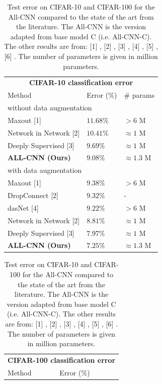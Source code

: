 \documentclass{article} %
\begin{document}
\begin{table}[h]
\caption{Test error on CIFAR-10 and CIFAR-100 for the All-CNN compared to the
  state of the art from the literature. The All-CNN is the version
  adapted from base model C (i.e. All-CNN-C). The other results are from: [1]
  \citep{Goodfellow2013}, [2] \citep{Lin_2014}, [3] \citep{Lee_2014},
  [4] \citep{Stollenga_2014}, [5] \citep{Nitish2013}, [6] \citep{Graham2015}. The number of
  parameters is given in million parameters.}
\label{results-cifar10}
\begin{minipage}{0.49\linewidth}
\centering
\begin{tabular}{lll}
\multicolumn{3}{c}{\bf CIFAR-10 classification error} \\
\multicolumn{1}{l}{Method} & \multicolumn{1}{l}{Error ($\%$)} & \multicolumn{1}{l}{\# params} \\
\hline
\multicolumn{3}{l}{without data augmentation} \\
\hline
Maxout [1]          &  $11.68 \%$ & $> 6$ M \\
Network in Network [2]         &  $10.41 \%$ & $\approx 1$ M \\
Deeply Supervised [3]        & $9.69 \%$  & $\approx 1$ M \\
\textbf{ALL-CNN (Ours)}         &  $\mathbf{9.08 \%}$ & $\approx 1.3$ M \\
\hline
\multicolumn{3}{l}{with data augmentation} \\
\hline
Maxout [1]         &  $9.38 \%$ & $> 6$ M \\
DropConnect [2]         &  $9.32 \%$ & - \\
dasNet [4]         &  $9.22 \%$ & $> 6$ M \\
Network in Network [2]         &  $8.81 \%$ & $\approx 1$ M \\
Deeply Supervised [3]         & $7.97 \%$  & $\approx 1$ M \\
\textbf{ALL-CNN (Ours)}         &  $\mathbf{7.25 \%}$ & $\approx 1.3$ M \\
\end{tabular}
\end{minipage}
\hspace{0.5cm}
\begin{minipage}{0.49\linewidth}
\centering
\begin{tabular}{ll}
\multicolumn{2}{c}{\bf CIFAR-100 classification error } \\
Method & Error ($\%$) \\ %

\end{tabular}
\end{minipage}
\end{table}
\end{document}
